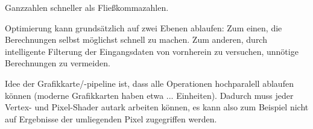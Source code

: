 Ganzzahlen schneller als Fließkommazahlen.

Optimierung kann grundsätzlich auf zwei Ebenen ablaufen: Zum einen, die Berechnungen selbst möglichst schnell zu machen. Zum anderen, durch intelligente Filterung der Eingangsdaten von vornherein zu versuchen, unnötige Berechnungen zu vermeiden.

Idee der Grafikkarte/-pipeline ist, dass alle Operationen hochparalell ablaufen können (moderne Grafikkarten haben etwa ... Einheiten). Dadurch muss jeder Vertex- und Pixel-Shader autark arbeiten können, es kann also zum Beispiel nicht auf Ergebnisse der umliegenden Pixel zugegriffen werden.

